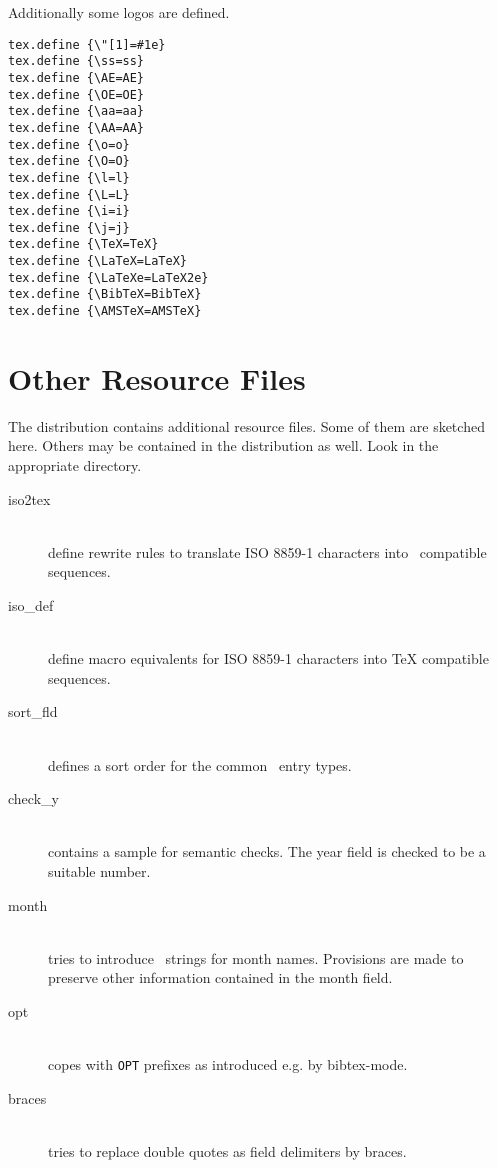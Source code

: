 \documentclass[11pt,a4paper]{scrbook}
\newcommand\file[1]{\textsf{#1}}
\begin{document}
Additionally some logos are defined.
\begin{lstlisting}[language=BibTool]
tex.define {\"[1]=#1e}
tex.define {\ss=ss}
tex.define {\AE=AE}
tex.define {\OE=OE}
tex.define {\aa=aa}
tex.define {\AA=AA}
tex.define {\o=o}
tex.define {\O=O}
tex.define {\l=l}
tex.define {\L=L}
tex.define {\i=i}
tex.define {\j=j}
tex.define {\TeX=TeX}
tex.define {\LaTeX=LaTeX}
tex.define {\LaTeXe=LaTeX2e}
tex.define {\BibTeX=BibTeX}
tex.define {\AMSTeX=AMSTeX}
\end{lstlisting}


\section{Other Resource Files}

The distribution contains additional resource files. Some of them are sketched
here. Others may be contained in the distribution as well. Look in the
appropriate directory.

\begin{description}
\item [\file{iso2tex}]\ \\
  define rewrite rules to translate ISO 8859-1 characters into \BibTeX\ 
  compatible sequences.
\item [\file{iso\_def}]\ \\
  define macro equivalents for ISO 8859-1 characters into \TeX{} compatible
  sequences.
\item [\file{sort\_fld}]\ \\
  defines a sort order for the common \BibTeX\ entry types.
\item [\file{check\_y}]\ \\
  contains a sample for semantic checks. The year field is checked to be a
  suitable number.
\item [\file{month}]\ \\
  tries to introduce \BibTeX\ strings for month names.  Provisions are made to
  preserve other information contained in the month field.
\item [\file{opt}]\ \\
  copes with \texttt{OPT} prefixes as introduced e.g. by bibtex-mode.
\item [\file{braces}]\ \\
  tries to replace double quotes as field delimiters by braces.
\end{description}





\ifHTML\else
\ifx\ptt\undefined\global\let\ptt\ttfamily\fi
\ifx\psf\undefined\global\let\psf\sffamily\fi
\ifx\pdollar\undefined\global\let\pdollar\$\fi
\fi
\printindex
\end{document}
